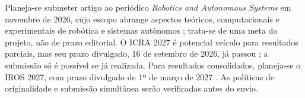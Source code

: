 \documentclass[mscproposta,portugues]{ppgccufmg}
\begin{document}
Planeja-se submeter artigo ao periódico \textit{Robotics and Autonomous Systems} em novembro de 2026, cujo escopo abrange aspectos teóricos, computacionais e experimentais de robótica e sistemas autônomos \citep{rasjournal}; trata-se de uma meta do projeto, não de prazo editorial. O ICRA 2027 é potencial veículo para resultados parciais, mas seu prazo divulgado, 16 de setembro de 2026, já passou \citep{icra2027}; a submissão só é possível se já realizada. Para resultados consolidados, planeja-se o IROS 2027, com prazo divulgado de 1º de março de 2027 \citep{iros2027}. As políticas de originalidade e submissão simultânea serão verificadas antes do envio.

\renewcommand\bibname{Referências}


\end{document}
